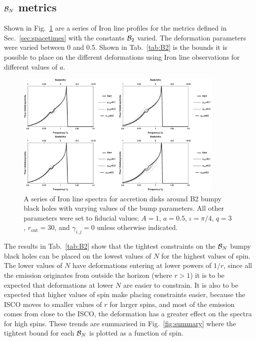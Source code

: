 \subsection{${\cal{B}}_{N}$ metrics}\label{subsubsec:B2res}
Shown in Fig.\ \ref{fig:B2Line} are a series of Iron line profiles for the metrics defined in Sec.\ \ref{sec:spacetimes} with the constants ${\cal{B}}_{2}$ varied. The deformation parameters were varied between 0 and 0.5. Shown in Tab.\ \ref{tab:B2} is the bounds it is possible to place on the different deformations using Iron line observations for different values of $a$.
\begin{figure}[t]
 \centering
 \includegraphics[trim=0cm 0cm 0cm 0cm, width=0.9\textwidth]{B2IronLines.pdf}
 \caption{A series of Iron line spectra for accretion disks around B2 bumpy black holes with varying values of the bump parameters. All other parameters were set to fiducial values; $A=1$, $a=0.5$, $\iota=\pi/4$, $q=3$, $r_{\textrm{out}}=30$, and $\gamma_{i,j}=0$ unless otherwise indicated.}
 \label{fig:B2Line}
\end{figure}

The results in Tab.\ \ref{tab:B2} show that the tightest constraints on the ${\cal{B}}_{N}$ bumpy black holes can be placed on the lowest values of $N$ for the highest values of spin. The lower values of $N$ have deformations entering at lower powers of $1/r$, since all the emission originates from outside the horizon (where $r>1$) it is to be expected that deformations at lower $N$ are easier to constrain. It is also to be expected that higher values of spin make placing constraints easier, because the ISCO moves to smaller values of $r$ for larger spins, and most of the emission comes from close to the ISCO, the deformation has a greater effect on the spectra for high spins. These trends are summarised in Fig.\ \ref{fig:summary} where the tightest bound for each ${\cal{B}}_{N}$ is plotted as a function of spin.

